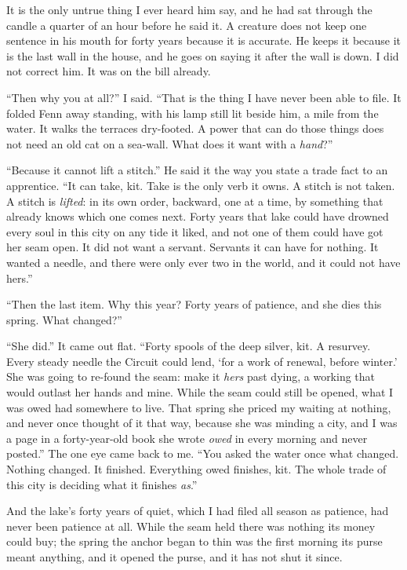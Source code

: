It is the only untrue thing I ever heard him say, and he had sat through the candle a quarter of an hour before he said it. A creature does not keep one sentence in his mouth for forty years because it is accurate. He keeps it because it is the last wall in the house, and he goes on saying it after the wall is down. I did not correct him. It was on the bill already.

``Then why you at all?'' I said. ``That is the thing I have never been able to file. It folded Fenn away standing, with his lamp still lit beside him, a mile from the water. It walks the terraces dry-footed. A power that can do those things does not need an old cat on a sea-wall. What does it want with a \emph{hand}?''

``Because it cannot lift a stitch.'' He said it the way you state a trade fact to an apprentice. ``It can take, kit. Take is the only verb it owns. A stitch is not taken. A stitch is \emph{lifted}: in its own order, backward, one at a time, by something that already knows which one comes next. Forty years that lake could have drowned every soul in this city on any tide it liked, and not one of them could have got her seam open. It did not want a servant. Servants it can have for nothing. It wanted a needle, and there were only ever two in the world, and it could not have hers.''

``Then the last item. Why this year? Forty years of patience, and she dies this spring. What changed?''

``She did.'' It came out flat. ``Forty spools of the deep silver, kit. A resurvey. Every steady needle the Circuit could lend, `for a work of renewal, before winter.' She was going to re-found the seam: make it \emph{hers} past dying, a working that would outlast her hands and mine. While the seam could still be opened, what I was owed had somewhere to live. That spring she priced my waiting at nothing, and never once thought of it that way, because she was minding a city, and I was a page in a forty-year-old book she wrote \emph{owed} in every morning and never posted.'' The one eye came back to me. ``You asked the water once what changed. Nothing changed. It finished. Everything owed finishes, kit. The whole trade of this city is deciding what it finishes \emph{as}.''

And the lake's forty years of quiet, which I had filed all season as patience, had never been patience at all. While the seam held there was nothing its money could buy; the spring the anchor began to thin was the first morning its purse meant anything, and it opened the purse, and it has not shut it since.

